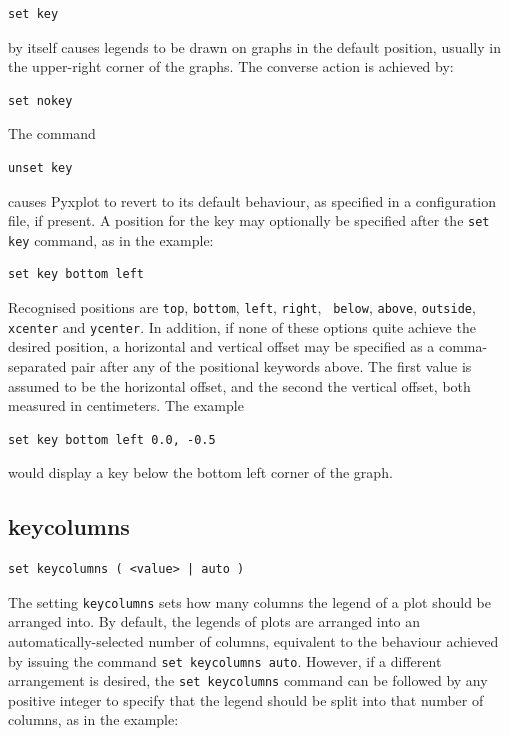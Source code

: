 \begin{verbatim}
set key
\end{verbatim}

\noindent by itself causes legends to be drawn on graphs in the default
position, usually in the upper-right corner of the graphs. The converse action
is achieved by:

\begin{verbatim}
set nokey
\end{verbatim}

\noindent The command

\begin{verbatim}
unset key
\end{verbatim}

\noindent causes Pyxplot to revert to its default behaviour, as specified in a
configuration file, if present. A position for the key may optionally be
specified after the {\tt set key} command, as in the example:

\begin{verbatim}
set key bottom left
\end{verbatim}

Recognised positions are {\tt top}, {\tt bottom}, {\tt left}, {\tt right}, {\tt
below}, {\tt above}, {\tt outside}, {\tt xcenter} and {\tt ycenter}. In
addition, if none of these options quite achieve the desired position, a
horizontal and vertical offset may be specified as a comma-separated pair after
any of the positional keywords above.  The first value is assumed to be the
horizontal offset, and the second the vertical offset, both measured in
centimeters.  The example

\begin{verbatim}
set key bottom left 0.0, -0.5
\end{verbatim}

\noindent would display a key below the bottom left corner of the graph.


\subsection{keycolumns}

\begin{verbatim}
set keycolumns ( <value> | auto )
\end{verbatim}

The setting {\tt keycolumns} sets how many columns the legend of a plot should
be arranged into. By default, the legends of plots are arranged into an
automatically-selected number of columns, equivalent to the behaviour achieved
by issuing the command {\tt set key\-columns auto}. However, if a different
arrangement is desired, the {\tt set keycolumns} command can be followed by any
positive integer to specify that the legend should be split into that number of
columns, as in the example:


